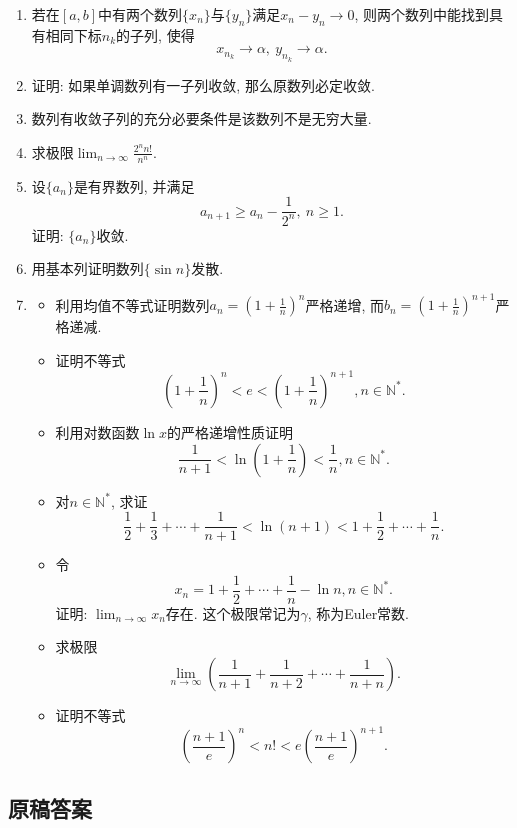 \documentclass[UTF8,11pt, a4paper, oneside, fontset=none]{ctexbook}
\begin{document}
\begin{enumerate}
\item 若在$[a, b]$中有两个数列$\{ x_n \}$与$\{ y_n \}$满足$x_n - y_n \to 0$, 则两个数列中能找到具有相同下标$n_k$的子列, 使得
\[
x_{n_k} \to \alpha, \ y_{n_k} \to \alpha.
\]

\item 证明: 如果单调数列有一子列收敛, 那么原数列必定收敛.

\item 数列有收敛子列的充分必要条件是该数列不是无穷大量.

\item 求极限$\lim_{n \to \infty} \frac{2^n n!}{n^n}$.

\item 设$\{a_n\}$是有界数列, 并满足
\[
a_{n+1} \geq a_n - \frac{1}{2^n}, \ n \geq 1.
\]
证明: $\{a_n\}$收敛.

\item 用基本列证明数列$\{ \sin n \}$发散.


\item
\begin{itemize}
\item[(1)] 利用均值不等式证明数列$a_n = \left( 1 + \frac{1}{n}\right)^n$严格递增, 而$b_n = \left( 1 + \frac{1}{n}\right)^{n+1}$严格递减.
\item[(2)] 证明不等式
\[
\left( 1 + \frac{1}{n}\right)^n < e < \left( 1 + \frac{1}{n}\right)^{n+1}, n \in \mathbb N^*.
\]
\item[(3)] 利用对数函数$\ln x$的严格递增性质证明
\[
\frac{1}{n+1} < \ln(1 + \frac{1}{n}) < \frac{1}{n}, n \in \mathbb N^*.
\]
\item[(4)] 对$n \in \mathbb N^*$, 求证
\[
\frac{1}{2} + \frac{1}{3} + \cdots + \frac{1}{n+1} < \ln(n+1) < 1 + \frac{1}{2} + \cdots + \frac{1}{n}.
\]
\item[(5)] 令
\[
x_n = 1 + \frac{1}{2} + \cdots +\frac{1}{n} - \ln n, n \in \mathbb N^*.
\]
证明: $\lim_{n \to \infty} x_n$存在. 这个极限常记为$\gamma$, 称为Euler常数.
\item[(6)] 求极限
\[
\lim_{n \to \infty} \left( \frac{1}{n+1} + \frac{1}{n+2} + \cdots + \frac{1}{n+n}\right).
\]
\item[(7)] 证明不等式
\[
\left( \frac{n+1}{e} \right)^n < n! < e \left( \frac{n+1}{e} \right)^{n+1}.
\]
\end{itemize}

\end{enumerate}

\clearpage

\subsection*{原稿答案}
\end{document}
